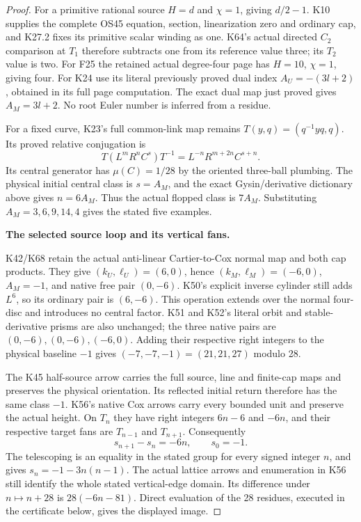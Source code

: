 \begin{proof}
For a primitive rational source \(H=d\) and \(\chi=1\), giving
\(d/2-1\). K10 supplies the complete OS45 equation, section,
linearization zero and ordinary cap, and K27.2 fixes its primitive
scalar winding as one. K64's actual directed \(C_2\) comparison at
\(T_1\) therefore subtracts one from its reference value three;
its \(T_2\) value is two. For F25 the retained actual degree-four
page has \(H=10\), \(\chi=1\), giving four. For K24 use its literal previously proved dual index \(A_U=-(3l+2)\), obtained in
its full page computation. The exact dual map just proved gives
\(A_M=3l+2\). No root Euler number is inferred from a residue.

For a fixed curve, K23's full common-link map remains
\(T(y,q)=(q^{-1}yq,q)\). Its proved relative conjugation is
\[
 T(L^mR^nC^s)T^{-1}=L^{-n}R^{m+2n}C^{s+n}.
\]
Its central generator has \(\mu(C)=1/28\) by the oriented
three-ball plumbing. The physical initial central class is
\(s=A_M\), and the exact Gysin/derivative dictionary above gives
\(n=6A_M\). Thus the actual flopped class is \(7A_M\).
Substituting \(A_M=3,6,9,14,4\) gives the stated five examples.

\par\medskip\noindent\textbf{The selected source loop and its vertical fans.}\par\nobreak
K42/K68 retain the actual anti-linear Cartier-to-Cox normal map and
both cap products. They give \((k_U,\ell_U)=(6,0)\), hence
\((k_M,\ell_M)=(-6,0)\), \(A_M=-1\), and native free pair
\((0,-6)\). K50's explicit inverse cylinder still adds \(L^6\),
so its ordinary pair is \((6,-6)\). This operation extends over the
normal four-disc and introduces no central factor. K51 and K52's
literal orbit and stable-derivative prisms are also unchanged; the
three native pairs are \((0,-6),(0,-6),(-6,0)\).
Adding their respective right integers to the physical baseline
\(-1\) gives \((-7,-7,-1)=(21,21,27)\) modulo 28.

The K45 half-source arrow carries the full source, line and finite-cap
maps and preserves the physical orientation. Its reflected initial
return therefore has the same class \(-1\). K56's native Cox arrows
carry every bounded unit and preserve the actual height. On \(T_n\)
they have right integers \(6n-6\) and \(-6n\), and their respective
target fans are \(T_{n-1}\) and \(T_{n+1}\). Consequently
\[
 s_{n+1}-s_n=-6n,\qquad s_0=-1.
\]
The telescoping is an equality in the stated group for every signed
integer \(n\), and gives \(s_n=-1-3n(n-1)\).
The actual lattice arrows and enumeration in K56 still identify the
whole stated vertical-edge domain. Its difference under \(n\mapsto
n+28\) is \(28(-6n-81)\). Direct evaluation of the 28 residues,
executed in the certificate below, gives the displayed image.


\end{proof}
